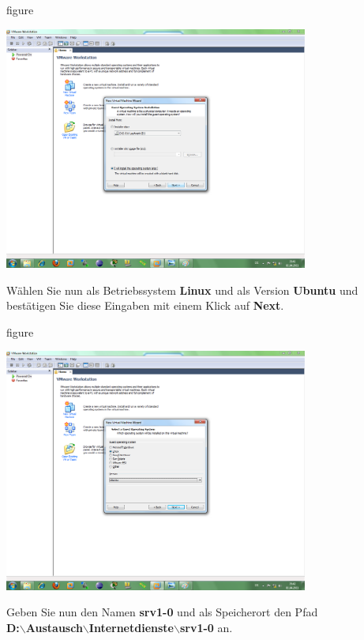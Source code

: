 \begin{nofloat}{figure}
\begin{center}
\includegraphics[width=0.75\textwidth]{screenshots/vm03.png}
\end{center}
\end{nofloat}

Wählen Sie nun als Betriebssystem \textbf{Linux} und als Version \textbf{Ubuntu} und bestätigen Sie diese
Eingaben mit einem Klick auf \textbf{Next}.

\begin{nofloat}{figure}
\begin{center}
\includegraphics[width=0.75\textwidth]{screenshots/vm04.png}
\end{center}
\end{nofloat}

Geben Sie nun den Namen \textbf{srv1-0} und als Speicherort den Pfad \\
\textbf{D:$\backslash$Austausch$\backslash$Internetdienste$\backslash$srv1-0}
an.

